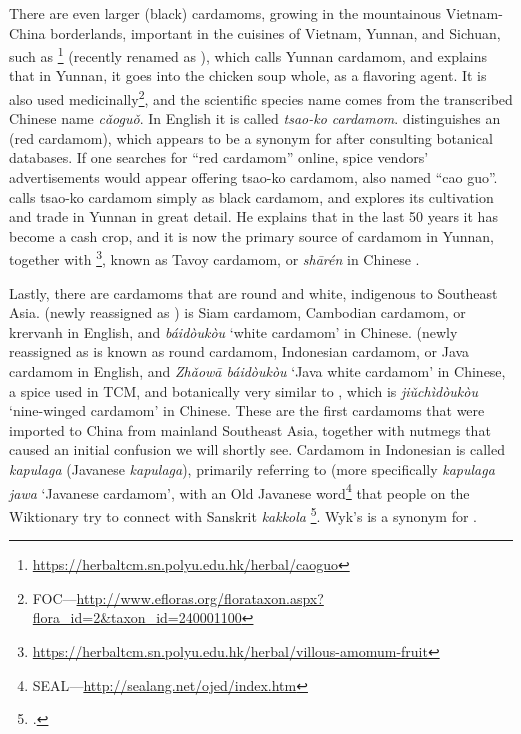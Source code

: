 There are even larger (black) cardamoms, growing in the mountainous Vietnam-China borderlands, important in the cuisines of Vietnam, Yunnan, and Sichuan, such as \footnote{\url{https://herbaltcm.sn.polyu.edu.hk/herbal/caoguo}} (recently renamed as ), which \textcite[326]{hu_food_2005} calls Yunnan cardamom, and explains that in Yunnan, it goes into the chicken soup whole, as a flavoring agent. It is also used medicinally\footnote{\gls{FOC}---\url{http://www.efloras.org/florataxon.aspx?flora_id=2&taxon_id=240001100}}, and the scientific species name comes from the transcribed Chinese name  \textit{cǎoguǒ}. In English it is called \textit{tsao-ko cardamom}. \textcite[326]{hu_food_2005} distinguishes an  (red cardamom), which appears to be a synonym for  after consulting botanical databases. If one searches for ``red cardamom'' online, spice vendors' advertisements would appear offering tsao-ko cardamom, also named ``cao guo''. \textcite{putzel_spice_2017} calls tsao-ko cardamom simply as black cardamom, and explores its cultivation and trade in Yunnan in great detail. He explains that in the last 50 years it has become a cash crop, and it is now the primary source of cardamom in Yunnan, together with \footnote{\url{https://herbaltcm.sn.polyu.edu.hk/herbal/villous-amomum-fruit}}, known as Tavoy cardamom, or  \textit{shārén} in Chinese \autocite[41]{putzel_spice_2017}.

Lastly, there are cardamoms that are round and white, indigenous to Southeast Asia.  (newly reassigned as ) is Siam cardamom, Cambodian cardamom, or krervanh in English, and  \textit{báidòukòu} `white cardamom' in Chinese.  (newly reassigned as  is known as round cardamom, Indonesian cardamom, or Java cardamom in English, and  \textit{Zhǎowā báidòukòu} `Java white cardamom' in Chinese, a spice used in \gls{TCM}, and botanically very similar to , which is  \textit{jiǔchìdòukòu} `nine-winged cardamom' in Chinese. These are the first cardamoms that were imported to China from mainland Southeast Asia, together with nutmegs that caused an initial confusion we will shortly see. Cardamom in Indonesian is called \textit{kapulaga} (Javanese  
\textit{kapulaga}), primarily referring to  (more specifically \textit{kapulaga jawa} `Javanese cardamom', with an Old Javanese word\footnote{\gls{SEAL}---\url{http://sealang.net/ojed/index.htm}} that people on the Wiktionary try to connect with Sanskrit  \textit{kakkola} \footcite[241. ]{monier-williams_sanskrit-english_1899}. Wyk's  is a synonym for .

